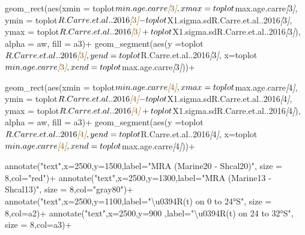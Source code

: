 \documentclass[
]{article}
\newenvironment{Shaded}{\begin{snugshade}}{\end{snugshade}}
\newcommand{\CommentTok}[1]{\textcolor[rgb]{0.56,0.35,0.01}{\textit{#1}}}
\newcommand{\NormalTok}[1]{#1}
\newcommand{\OtherTok}[1]{\textcolor[rgb]{0.56,0.35,0.01}{#1}}
\begin{document}
\begin{Shaded}
\begin{Highlighting}[]
\NormalTok{  geom\_rect(aes(xmin = toplot$min.age.carre}\CommentTok{[}\OtherTok{3}\CommentTok{]}\NormalTok{, }
\NormalTok{                xmax = toplot$max.age.carre}\CommentTok{[}\OtherTok{3}\CommentTok{]}\NormalTok{, }
\NormalTok{                ymin = toplot$R.Carre.et.al..2016}\CommentTok{[}\OtherTok{3}\CommentTok{]}\NormalTok{{-}toplot$X1.sigma.sdR.Carre.et.al..2016}\CommentTok{[}\OtherTok{3}\CommentTok{]}\NormalTok{,}
\NormalTok{                ymax = toplot$R.Carre.et.al..2016}\CommentTok{[}\OtherTok{3}\CommentTok{]}\NormalTok{+toplot$X1.sigma.sdR.Carre.et.al..2016}\CommentTok{[}\OtherTok{3}\CommentTok{]}\NormalTok{),}
\NormalTok{            alpha = aw,}
\NormalTok{            fill = a3)+}
\NormalTok{  geom\_segment(aes(y =toplot$R.Carre.et.al..2016}\CommentTok{[}\OtherTok{3}\CommentTok{]}\NormalTok{,}
\NormalTok{                   yend =toplot$R.Carre.et.al..2016}\CommentTok{[}\OtherTok{3}\CommentTok{]}\NormalTok{,}
\NormalTok{                   x=toplot$min.age.carre}\CommentTok{[}\OtherTok{3}\CommentTok{]}\NormalTok{,}
\NormalTok{                   xend=toplot$max.age.carre}\CommentTok{[}\OtherTok{3}\CommentTok{]}\NormalTok{))+}
  
\NormalTok{  geom\_rect(aes(xmin = toplot$min.age.carre}\CommentTok{[}\OtherTok{4}\CommentTok{]}\NormalTok{, }
\NormalTok{                xmax = toplot$max.age.carre}\CommentTok{[}\OtherTok{4}\CommentTok{]}\NormalTok{, }
\NormalTok{                ymin = toplot$R.Carre.et.al..2016}\CommentTok{[}\OtherTok{4}\CommentTok{]}\NormalTok{{-}toplot$X1.sigma.sdR.Carre.et.al..2016}\CommentTok{[}\OtherTok{4}\CommentTok{]}\NormalTok{,}
\NormalTok{                ymax = toplot$R.Carre.et.al..2016}\CommentTok{[}\OtherTok{4}\CommentTok{]}\NormalTok{+toplot$X1.sigma.sdR.Carre.et.al..2016}\CommentTok{[}\OtherTok{4}\CommentTok{]}\NormalTok{),}
\NormalTok{            alpha = aw,}
\NormalTok{            fill = a3)+}
\NormalTok{  geom\_segment(aes(y =toplot$R.Carre.et.al..2016}\CommentTok{[}\OtherTok{4}\CommentTok{]}\NormalTok{,}
\NormalTok{                   yend =toplot$R.Carre.et.al..2016}\CommentTok{[}\OtherTok{4}\CommentTok{]}\NormalTok{,}
\NormalTok{                   x=toplot$min.age.carre}\CommentTok{[}\OtherTok{4}\CommentTok{]}\NormalTok{,}
\NormalTok{                   xend=toplot$max.age.carre}\CommentTok{[}\OtherTok{4}\CommentTok{]}\NormalTok{))+}

\NormalTok{  annotate("text",x=2500,y=1500,label="MRA (Marine20 {-} Shcal20)", size = 8,col="red")+}
\NormalTok{  annotate("text",x=2500,y=1300,label="MRA (Marine13 {-} Shcal13)", size = 8,col="gray80")+}
\NormalTok{  annotate("text",x=2500,y=1100,label="\textbackslash{}u0394R(t) on  0 to 24°S", size = 8,col=a2)+}
\NormalTok{  annotate("text",x=2500,y=900 ,label="\textbackslash{}u0394R(t) on 24 to 32°S", size = 8,col=a3)+}
  

\end{Highlighting}
\end{Shaded}
\end{document}
